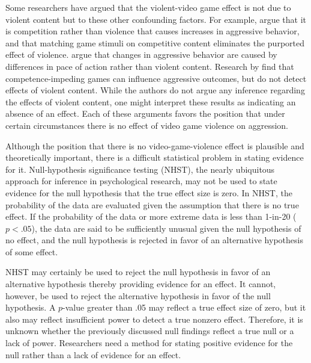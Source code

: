 \documentclass[man]{apa6}
\begin{document}
Some researchers have argued that the violent-video game effect is not due to violent content but to these other confounding factors.  For example, \citet{Adachi:Willoughby:2011} argue that it is competition rather than violence that causes increases in aggressive behavior, and that matching game stimuli on competitive content eliminates the purported effect of violence. \citet{Elson:etal:2013} argue that changes in aggressive behavior are caused by differences in pace of action rather than violent content. Research by \citet{Przybylski:etal:2014} find that competence-impeding games can influence aggressive outcomes, but do not detect effects of violent content. While the authors do not argue any inference regarding the effects of violent content, one might interpret these results as indicating an absence of an effect. Each of these arguments favors the position that under certain circumstances there is no effect of video game violence on aggression.  

Although the position that there is no video-game-violence effect is plausible and theoretically important, there is a difficult statistical problem in stating evidence for it. Null-hypothesis significance testing (NHST), the nearly ubiquitous approach for inference in psychological research, may not be used to state evidence for the null hypothesis that the true effect size is zero.  In NHST, the probability of the data are evaluated given the assumption that there is no true effect. If the probability of the data or more extreme data is less than 1-in-20 ($p<.05$), the data are said to be sufficiently unusual given the null hypothesis of no effect, and the null hypothesis is rejected in favor of an alternative hypothesis of some effect.

NHST may certainly be used to reject the null hypothesis in favor of an alternative hypothesis thereby providing evidence for an effect.  It cannot, however, be used to  reject the alternative hypothesis in favor of the null hypothesis. A $p$-value greater than .05 may reflect a true effect size of zero, but it also may reflect insufficient power to detect a true nonzero effect. Therefore, it is unknown whether the previously discussed null findings reflect a true null or a lack of power.  Researchers need a method for stating positive evidence for the null rather than a lack of evidence for an effect.
\end{document}
